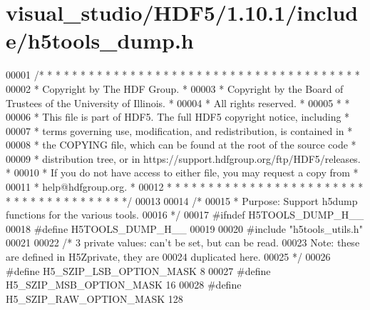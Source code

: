 \hypertarget{visual__studio_2_h_d_f5_21_810_81_2include_2h5tools__dump_8h_source}{}\section{visual\+\_\+studio/\+H\+D\+F5/1.10.1/include/h5tools\+\_\+dump.h}
\label{visual__studio_2_h_d_f5_21_810_81_2include_2h5tools__dump_8h_source}

\begin{DoxyCode}
00001 \textcolor{comment}{/* * * * * * * * * * * * * * * * * * * * * * * * * * * * * * * * * * * * * * *}
00002 \textcolor{comment}{ * Copyright by The HDF Group.                                               *}
00003 \textcolor{comment}{ * Copyright by the Board of Trustees of the University of Illinois.         *}
00004 \textcolor{comment}{ * All rights reserved.                                                      *}
00005 \textcolor{comment}{ *                                                                           *}
00006 \textcolor{comment}{ * This file is part of HDF5.  The full HDF5 copyright notice, including     *}
00007 \textcolor{comment}{ * terms governing use, modification, and redistribution, is contained in    *}
00008 \textcolor{comment}{ * the COPYING file, which can be found at the root of the source code       *}
00009 \textcolor{comment}{ * distribution tree, or in https://support.hdfgroup.org/ftp/HDF5/releases.  *}
00010 \textcolor{comment}{ * If you do not have access to either file, you may request a copy from     *}
00011 \textcolor{comment}{ * help@hdfgroup.org.                                                        *}
00012 \textcolor{comment}{ * * * * * * * * * * * * * * * * * * * * * * * * * * * * * * * * * * * * * * */}
00013 
00014 \textcolor{comment}{/*}
00015 \textcolor{comment}{ * Purpose:     Support h5dump functions for the various tools.}
00016 \textcolor{comment}{ */}
00017 \textcolor{preprocessor}{#ifndef H5TOOLS\_DUMP\_H\_\_}
00018 \textcolor{preprocessor}{#define H5TOOLS\_DUMP\_H\_\_}
00019 
00020 \textcolor{preprocessor}{#include "h5tools\_utils.h"}
00021 
00022 \textcolor{comment}{/* 3 private values: can't be set, but can be read.}
00023 \textcolor{comment}{   Note: these are defined in H5Zprivate, they are}
00024 \textcolor{comment}{   duplicated here.}
00025 \textcolor{comment}{ */}
00026 \textcolor{preprocessor}{#define H5\_SZIP\_LSB\_OPTION\_MASK         8}
00027 \textcolor{preprocessor}{#define H5\_SZIP\_MSB\_OPTION\_MASK         16}
00028 \textcolor{preprocessor}{#define H5\_SZIP\_RAW\_OPTION\_MASK         128}

\end{DoxyCode}
